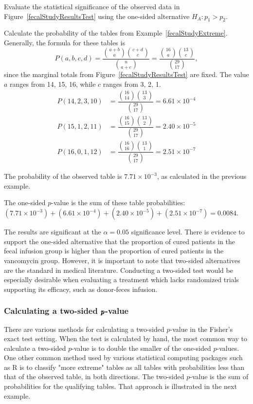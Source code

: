 \begin{examplewrap}
\begin{nexample}{Evaluate the statistical significance of the observed data in Figure~\ref{fecalStudyResultsTest} using the one-sided alternative $H_A: p_1 > p_2$.}

Calculate the probability of the tables from Example~\ref{fecalStudyExtreme}. Generally, the formula for these tables is 
\[P(a, b, c, d) = \dfrac{ {a+b \choose a} {c+d \choose c}}{{n \choose a+c}} = \dfrac{ {16 \choose a} {13 \choose c}}{{29 \choose 17}},\] 
since the marginal totals from Figure~\ref{fecalStudyResultsTest} are fixed. The value $a$ ranges from 14, 15, 16, while $c$ ranges from 3, 2, 1.
\begin{align*}
P(14, 2, 3, 10) &= \dfrac{ {16 \choose 14} {13 \choose 3}}{{29 \choose 17}} = 6.61 \times 10^{-4} \\
P(15, 1, 2, 11) &= \dfrac{ {16 \choose 15} {13 \choose 2}}{{29 \choose 17}} = 2.40 \times 10^{-5} \\
P(16, 0, 1, 12) &= \dfrac{ {16 \choose 16} {13 \choose 1}}{{29 \choose 17}} = 2.51 \times 10^{-7}
\end{align*}

The probability of the observed table is $7.71 \times 10^{-3}$, as calculated in the previous example.

The one-sided $p$-value is the sum of these table probabilities: $(7.71 \times 10^{-3}) + (6.61 \times 10^{-4}) + (2.40 \times 10^{-5}) + (2.51 \times 10^{-7}) = 0.0084.$

The results are significant at the $\alpha = 0.05$ significance level. There is evidence to support the one-sided alternative that the proportion of cured patients in the fecal infusion group is higher than the proportion of cured patients in the vancomycin group. However, it is important to note that two-sided alternatives are the standard in medical literature. Conducting a two-sided test would be especially desirable when evaluating a treatment which lacks randomized trials supporting its efficacy, such as donor-feces infusion.
\end{nexample}
\end{examplewrap}


\subsubsection{Calculating a two-sided $\pmb{\MakeLowercase{p}}$-value}

There are various methods for calculating a two-sided $p$-value in the Fisher's exact test setting. When the test is calculated by hand, the most common way to calculate a two-sided $p$-value is to double the smaller of the one-sided $p$-values. One other common method used by various statistical computing packages such as \textsf{R} is to classify "more extreme" tables as all tables with probabilities less than that of the observed table, in both directions. The two-sided $p$-value is the sum of probabilities for the qualifying tables.  That approach is illustrated in the next example.

